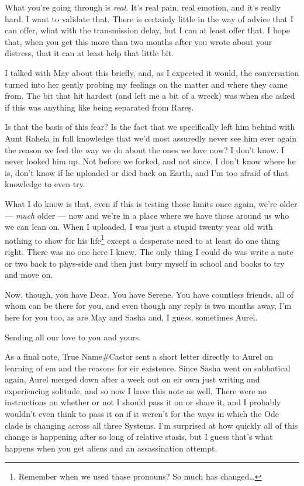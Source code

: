 What you're going through is \emph{real}. It's real pain, real emotion, and it's really hard. I want to validate that. There is certainly little in the way of advice that I can offer, what with the transmission delay, but I can at least offer that. I hope that, when you get this more than two months after you wrote about your distress, that it can at least help that little bit.

I talked with May about this briefly, and, as I expected it would, the conversation turned into her gently probing my feelings on the matter and where they came from. The bit that hit hardest (and left me a bit of a wreck) was when she asked if this was anything like being separated from Rareș.

Is that the basis of this fear? Is the fact that we specifically left him behind with Aunt Rahela in full knowledge that we'd most assuredly never see him ever again the reason we feel the way we do about the ones we love now? I don't know. I never looked him up. Not before we forked, and not since. I don't know where he is, don't know if he uploaded or died back on Earth, and I'm too afraid of that knowledge to even try.

What I do know is that, even if this is testing those limits once again, we're older — \emph{much} older — now and we're in a place where we have those around us who we can lean on. When I uploaded, I was just a stupid twenty year old with nothing to show for his life\footnote{Remember when we used those pronouns? So much has changed\ldots{}} except a desperate need to at least do one thing right. There was no one here I knew. The only thing I could do was write a note or two back to phys-side and then just bury myself in school and books to try and move on.

Now, though, you have Dear. You have Serene. You have countless friends, all of whom can be there for you, and even though any reply is two months away, I'm here for you too, as are May and Sasha and, I guess, sometimes Aurel.

Sending all our love to you and yours.

As a final note, True Name\#Castor sent a short letter directly to Aurel on learning of em and the reasons for eir existence. Since Sasha went on sabbatical again, Aurel merged down after a week out on eir own just writing and experiencing solitude, and so now I have this note as well. There were no instructions on whether or not I should pass it on or share it, and I probably wouldn't even think to pass it on if it weren't for the ways in which the Ode clade is changing across all three Systems. I'm surprised at how quickly all of this change is happening after so long of relative stasis, but I guess that's what happens when you get aliens and an assassination attempt.

